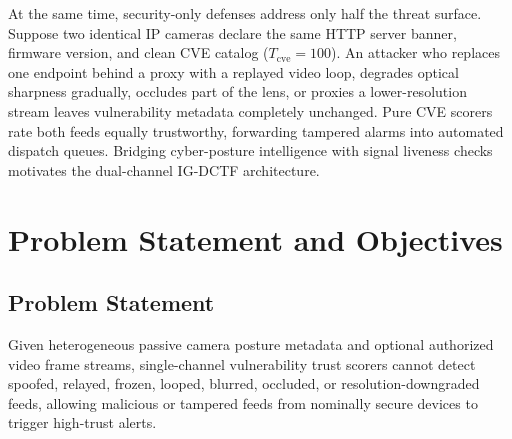 At the same time, security-only defenses address only half the threat surface. Suppose two identical IP cameras declare the same HTTP server banner, firmware version, and clean CVE catalog ($T_{\mathrm{cve}} = 100$). An attacker who replaces one endpoint behind a proxy with a replayed video loop, degrades optical sharpness gradually, occludes part of the lens, or proxies a lower-resolution stream leaves vulnerability metadata completely unchanged. Pure CVE scorers rate both feeds equally trustworthy, forwarding tampered alarms into automated dispatch queues. Bridging cyber-posture intelligence with signal liveness checks motivates the dual-channel IG-DCTF architecture.

\section{Problem Statement and Objectives}
\subsection*{Problem Statement}
Given heterogeneous passive camera posture metadata and optional authorized video frame streams, single-channel vulnerability trust scorers cannot detect spoofed, relayed, frozen, looped, blurred, occluded, or resolution-downgraded feeds, allowing malicious or tampered feeds from nominally secure devices to trigger high-trust alerts.

